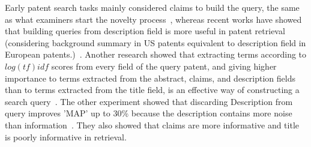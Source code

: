 Early patent search tasks mainly considered claims to build the query, the same as what examiners start the novelty process~\citep{konishi2005query, takaki2004associative, mase2005proposal, fujii2007enhancing}, whereas recent works have showed that building queries from description field is more useful in patent retrieval (considering background summary in US patents equivalent to description field in European patents.)~\citep{xue2009transforming, xue2009automatic, mahdabi2011building}. Another research showed that extracting terms according to $ log(tf)idf $ scores from every field of the query patent, and giving higher importance to terms extracted from the abstract, claims, and description fields than to terms extracted from the title field, is an effective way of constructing a search query~\citep{cetintas2012effective}. The other experiment showed that discarding Description from query improves 'MAP' up to 30\% because the description contains more noise than information~\citep{gobeill2010simple}. They also showed that claims are more informative and title is poorly informative in retrieval.   

